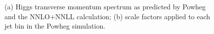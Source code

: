 \begin{figure}[!htbp]
\begin{center}
\caption{(a) Higgs transverse momentum spectrum as predicted by Powheg and the NNLO+NNLL calculation; (b) 
scale factors applied to each jet bin in the Powheg simulation.}
\label{fig:h160ww_pthiggs}
\end{center}
\end{figure}
